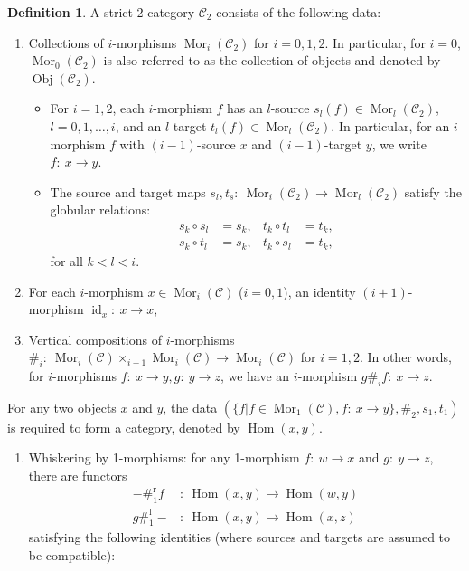 \documentclass[11pt, reqno]{amsart} %
\newcommand{\obj}{{\mathop{\mathrm{Obj}}}}
\newcommand{\mor}{{\mathop{\mathrm{Mor}}}}
\newcommand{\Hom}{{\mathop{\mathrm{Hom}}}}
\newcommand{\id}{{\mathop{\mathrm{id}}}}
\newcommand{\cC}{{\mathcal{C}}}
\theoremstyle{definition}
\newtheorem{definition}[theorem]{Definition}
\theoremstyle{remark}
\numberwithin{equation}{section}
\begin{document}
\begin{definition}\label{def:strict-2-cat}
A strict 2-category $\cC_2$ consists of the following data:
\begin{enumerate}
  \item \label{ax:2-Cat-2} Collections of $i$-morphisms $\mor_i(\cC_2)$ for $i=0,1,2$. In particular, for $i=0$, $\mor_0(\cC_2)$ is also referred to as the collection of objects and denoted by $\obj(\cC_2)$.
  \begin{itemize}
    \item For $i=1,2$, each $i$-morphism $f$ has an $l$-source $s_l(f)\in \mor_l(\cC_2)$, $l=0,1,\ldots,i$, and an $l$-target $t_l(f)\in \mor_l(\cC_2)$. In particular, for an $i$-morphism $f$ with $(i-1)$-source $x$ and $(i-1)$-target $y$, we write $f:~x\to y$.
    \item The source and target maps $s_l,t_s:~\mor_i(\cC_2)\to\mor_l(\cC_2)$ satisfy the globular relations:
    \begin{align}
      \nonumber
      s_k\circ s_l &= s_k, & t_k\circ t_l &= t_k, \\
      \nonumber
      s_k\circ t_l &= s_k, & t_k\circ s_l &= t_k,
    \end{align}
    for all $k<l<i$. 
  \end{itemize}
  \item \label{ax:2-Cat-3} For each $i$-morphism $x\in\mor_i(\cC)$ ($i=0,1$), an identity $(i+1)$-morphism $\id_x:~x\to x$,
  \item \label{ax:2-Cat-4} Vertical compositions of $i$-morphisms $\#_i:~\mor_i(\cC)\times_{i-1} \mor_i(\cC) \to \mor_i(\cC)$ for $i=1,2$.  In other words, for $i$-morphisms $f:~x\to y,g:~y\to z$, we have an $i$-morphism $g\#_if:~x\to z$.
\end{enumerate}
For any two objects $x$ and $y$, the data $(\{f|f\in\mor_1(\cC),f:~x\to y\},\#_2,s_1,t_1)$ is required to form a category, denoted by $\Hom(x,y)$. 
\begin{enumerate}
  \setcounter{enumi}{\thetemp}
  \item Whiskering by 1-morphisms: for any 1-morphism $f:~w\to x$ and $g:~y\to z$, there are functors\label{def:item:C-is-V}
  \begin{align}
    \nonumber
    -\#_1^{\text{r}}f&:~\Hom(x,y)\to \Hom(w,y) \\
    \nonumber
    g\#_1^{\text{l}}-&:~\Hom(x,y)\to \Hom(x,z)
  \end{align}
  satisfying the following identities (where sources and targets are assumed to be compatible):

\end{enumerate}
\end{definition}
\end{document}
